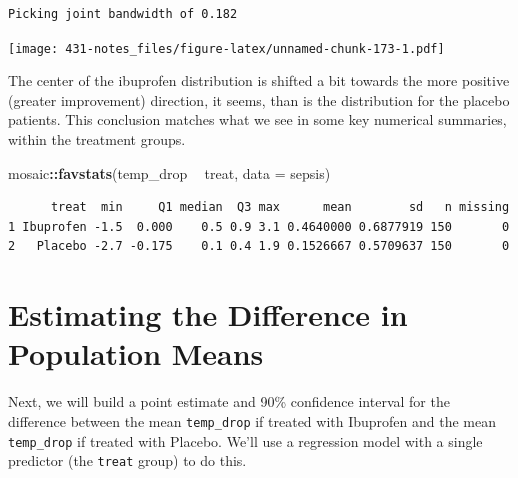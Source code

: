 \documentclass[
]{book}
\newenvironment{Shaded}{\begin{snugshade}}{\end{snugshade}}
\newcommand{\DataTypeTok}[1]{\textcolor[rgb]{0.13,0.29,0.53}{#1}}
\newcommand{\DecValTok}[1]{\textcolor[rgb]{0.00,0.00,0.81}{#1}}
\newcommand{\FloatTok}[1]{\textcolor[rgb]{0.00,0.00,0.81}{#1}}
\newcommand{\KeywordTok}[1]{\textcolor[rgb]{0.13,0.29,0.53}{\textbf{#1}}}
\newcommand{\NormalTok}[1]{#1}
\newcommand{\OperatorTok}[1]{\textcolor[rgb]{0.81,0.36,0.00}{\textbf{#1}}}
\newcommand{\OtherTok}[1]{\textcolor[rgb]{0.56,0.35,0.01}{#1}}
\newcommand{\StringTok}[1]{\textcolor[rgb]{0.31,0.60,0.02}{#1}}
\begin{document}
\begin{verbatim}
Picking joint bandwidth of 0.182
\end{verbatim}

\texttt{[image: 431-notes\_files/figure-latex/unnamed-chunk-173-1.pdf]}

The center of the ibuprofen distribution is shifted a bit towards the more positive (greater improvement) direction, it seems, than is the distribution for the placebo patients. This conclusion matches what we see in some key numerical summaries, within the treatment groups.

\begin{Shaded}
\begin{Highlighting}[]
\NormalTok{mosaic}\OperatorTok{::}\KeywordTok{favstats}\NormalTok{(temp_drop }\OperatorTok{~}\StringTok{ }\NormalTok{treat, }\DataTypeTok{data =}\NormalTok{ sepsis)}
\end{Highlighting}
\end{Shaded}

\begin{verbatim}
      treat  min     Q1 median  Q3 max      mean        sd   n missing
1 Ibuprofen -1.5  0.000    0.5 0.9 3.1 0.4640000 0.6877919 150       0
2   Placebo -2.7 -0.175    0.1 0.4 1.9 0.1526667 0.5709637 150       0
\end{verbatim}

\hypertarget{estimating-the-difference-in-population-means}{%
\section{Estimating the Difference in Population Means}\label{estimating-the-difference-in-population-means}}

Next, we will build a point estimate and 90\% confidence interval for the difference between the mean \texttt{temp\_drop} if treated with Ibuprofen and the mean \texttt{temp\_drop} if treated with Placebo. We'll use a regression model with a single predictor (the \texttt{treat} group) to do this.

\begin{Shaded}
\end{Shaded}
\end{document}
